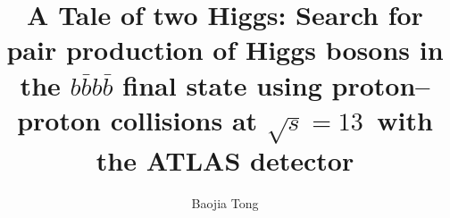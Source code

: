 \title{A Tale of two Higgs: Search for pair production of Higgs bosons in the $b\bar{b}b\bar{b}$ final state using proton--proton collisions at $\sqrt{s} = 13$\,\TeV{} with the ATLAS detector}
\author{Baojia Tong}






